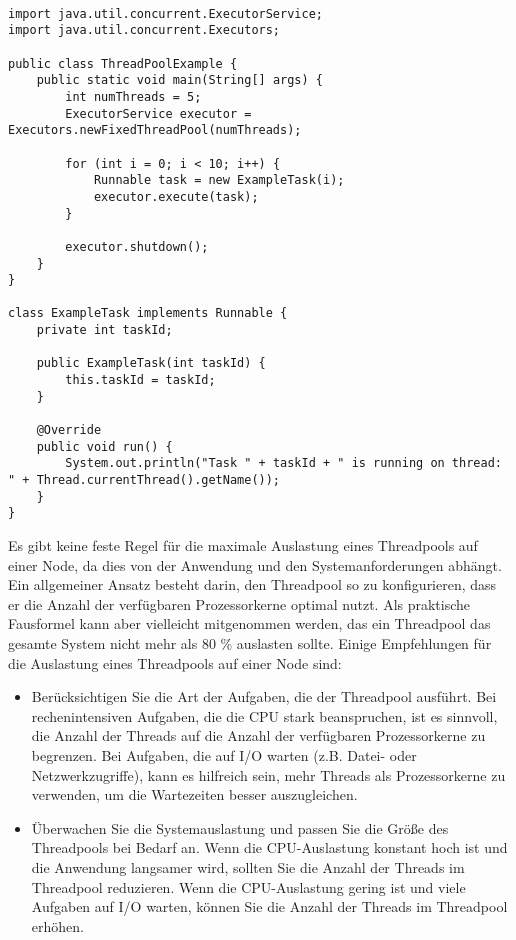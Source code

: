 \documentclass[../vs-script-first-v01.tex]{subfiles}
\begin{document}
\label{cha:chapter_name}

\begin{lstlisting}[caption={ExecutorService-Klasse},captionpos=b,label={lst:executor}]

import java.util.concurrent.ExecutorService;
import java.util.concurrent.Executors;

public class ThreadPoolExample {
    public static void main(String[] args) {
        int numThreads = 5;
        ExecutorService executor = Executors.newFixedThreadPool(numThreads);

        for (int i = 0; i < 10; i++) {
            Runnable task = new ExampleTask(i);
            executor.execute(task);
        }

        executor.shutdown();
    }
}

class ExampleTask implements Runnable {
    private int taskId;

    public ExampleTask(int taskId) {
        this.taskId = taskId;
    }

    @Override
    public void run() {
        System.out.println("Task " + taskId + " is running on thread: " + Thread.currentThread().getName());
    }
}
\end{lstlisting}


Es gibt keine feste Regel für die maximale Auslastung eines Threadpools auf einer Node, da dies von der Anwendung und den Systemanforderungen abhängt. Ein allgemeiner Ansatz besteht darin, den Threadpool so zu konfigurieren, dass er die Anzahl der verfügbaren Prozessorkerne optimal nutzt. Als praktische Fausformel kann aber vielleicht mitgenommen werden, das ein Threadpool das gesamte System nicht mehr als 80 \% auslasten sollte.
Einige Empfehlungen für die Auslastung eines Threadpools auf einer Node sind:
\begin{itemize}
\item Berücksichtigen Sie die Art der Aufgaben, die der Threadpool ausführt. Bei rechenintensiven Aufgaben, die die CPU stark beanspruchen, ist es sinnvoll, die Anzahl der Threads auf die Anzahl der verfügbaren Prozessorkerne zu begrenzen. Bei Aufgaben, die auf I/O warten (z.B. Datei- oder Netzwerkzugriffe), kann es hilfreich sein, mehr Threads als Prozessorkerne zu verwenden, um die Wartezeiten besser auszugleichen.
\item Überwachen Sie die Systemauslastung und passen Sie die Größe des Threadpools bei Bedarf an. Wenn die CPU-Auslastung konstant hoch ist und die Anwendung langsamer wird, sollten Sie die Anzahl der Threads im Threadpool reduzieren. Wenn die CPU-Auslastung gering ist und viele Aufgaben auf I/O warten, können Sie die Anzahl der Threads im Threadpool erhöhen.
\end{itemize}
\end{document}
